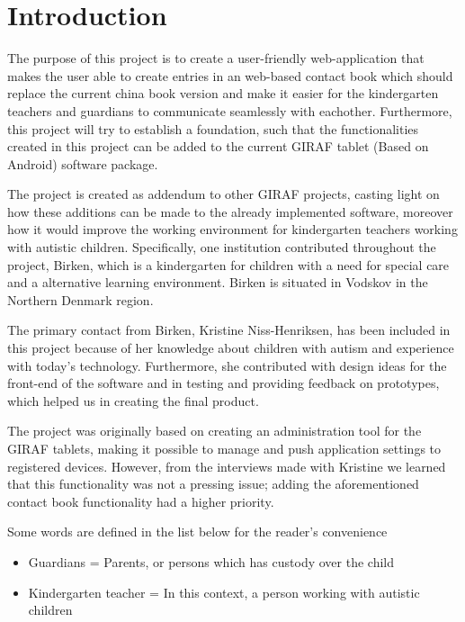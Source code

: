 \chapter{Introduction}

The purpose of this project is to create a user-friendly web-application that makes the user able to create entries in an web-based contact book which should replace the current china book version and make it easier for the kindergarten teachers and guardians to communicate seamlessly with eachother. Furthermore, this project will try to establish a foundation, such that the functionalities created in this project can be added to the current GIRAF tablet (Based on Android) software package.

The project is created as addendum to other GIRAF projects, casting light on how these additions can be made to the already implemented software, moreover how it would improve the working environment for kindergarten teachers working with autistic children. 
Specifically, one institution contributed throughout the project, Birken, which is a kindergarten for children with a need for special care and a alternative learning environment. Birken is situated in Vodskov in the Northern Denmark region.

The primary contact from Birken, Kristine Niss-Henriksen, has been included in this project because of her knowledge about children with autism and experience with today's technology. Furthermore, she contributed with design ideas for the front-end of the software and in testing and providing feedback on prototypes, which helped us in creating the final product.

The project was originally based on creating an administration tool for the GIRAF tablets, making it possible to manage and push application settings to registered devices. However, from the interviews made with Kristine we learned that this functionality was not a pressing issue; adding the aforementioned contact book functionality had a higher priority.  

Some words are defined in the list below for the reader's convenience
\begin{itemize}
\item{Guardians = Parents, or persons which has custody over the child}
\item{Kindergarten teacher = In this context, a person working with autistic children}
\end{itemize}